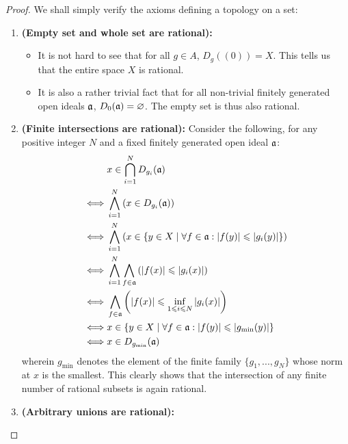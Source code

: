                 \begin{proof}
                    We shall simply verify the axioms defining a topology on a set:
                        \begin{enumerate}
                            \item \textbf{(Empty set and whole set are rational):} 
                                \begin{itemize}
                                    \item It is not hard to see that for all $g \in A$, $D_g((0)) = X$. This tells us that the entire space $X$ is rational.
                                    \item It is also a rather trivial fact that for all non-trivial finitely generated open ideals $\mathfrak{a}$, $D_0(\mathfrak{a}) = \varnothing$. The empty set is thus also rational.
                                \end{itemize}
                            \item \textbf{(Finite intersections are rational):} Consider the following, for any positive integer $N$ and a fixed finitely generated open ideal $\mathfrak{a}$:
                                $$
                                    \begin{aligned}
                                        & x \in \bigcap_{i = 1}^N D_{g_i}(\mathfrak{a})
                                        \\
                                        \iff & \bigwedge_{i = 1}^N \left(x \in D_{g_i}(\mathfrak{a})\right)
                                        \\
                                        \iff & \bigwedge_{i = 1}^N \left(x \in \{y \in X \mid \forall f \in \mathfrak{a}: |f(y)| \leqslant |g_i(y)|\}\right)
                                        \\
                                        \iff & \bigwedge_{i = 1}^N \bigwedge_{f \in \mathfrak{a}} \left(|f(x)| \leqslant |g_i(x)|\right)
                                        \\
                                        \iff & \bigwedge_{f \in \mathfrak{a}} \left(|f(x)| \leqslant \inf_{1 \leqslant i \leqslant N} |g_i(x)|\right)
                                        \\
                                        \iff & x \in \left\{y \in X \mid \forall f \in \mathfrak{a}: |f(y)| \leqslant |g_{\min}(y)|\right\}
                                        \\
                                        \iff & x \in D_{g_{\min}}(\mathfrak{a})
                                    \end{aligned}
                                $$
                            wherein $g_{\min}$ denotes the element of the finite family $\{g_1, ..., g_N\}$ whose norm at $x$ is the smallest. This clearly shows that the intersection of any finite number of rational subsets is again rational. 
                            \item \textbf{(Arbitrary unions are rational):} 
                        \end{enumerate}
                \end{proof}

